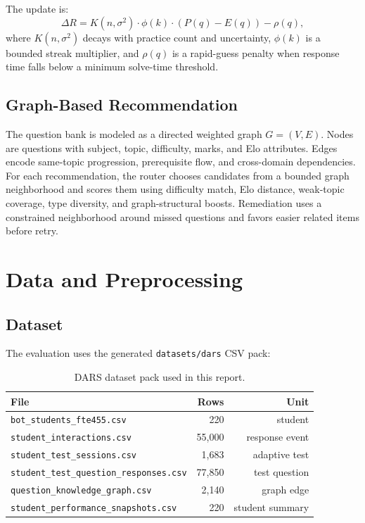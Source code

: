 \documentclass[sigconf,nonacm]{acmart}
\begin{document}
The update is:
\begin{equation}
\Delta R = K(n,\sigma^2)\cdot \phi(k)\cdot(P(q)-E(q)) - \rho(q),
\end{equation}
where $K(n,\sigma^2)$ decays with practice count and uncertainty, $\phi(k)$ is a bounded streak multiplier, and $\rho(q)$ is a rapid-guess penalty when response time falls below a minimum solve-time threshold.

\subsection{Graph-Based Recommendation}
The question bank is modeled as a directed weighted graph $G=(V,E)$. Nodes are questions with subject, topic, difficulty, marks, and Elo attributes. Edges encode same-topic progression, prerequisite flow, and cross-domain dependencies. For each recommendation, the router chooses candidates from a bounded graph neighborhood and scores them using difficulty match, Elo distance, weak-topic coverage, type diversity, and graph-structural boosts. Remediation uses a constrained neighborhood around missed questions and favors easier related items before retry.

\section{Data and Preprocessing}
\subsection{Dataset}
The evaluation uses the generated \texttt{datasets/dars} CSV pack:

\begin{table}[h]
\centering
\caption{DARS dataset pack used in this report.}
\label{tab:dataset}
\begin{tabular}{lrr}
\toprule
File & Rows & Unit \\
\midrule
\texttt{bot\_students\_fte455.csv} & 220 & student \\
\texttt{student\_interactions.csv} & 55,000 & response event \\
\texttt{student\_test\_sessions.csv} & 1,683 & adaptive test \\
\texttt{student\_test\_question\_responses.csv} & 77,850 & test question \\
\texttt{question\_knowledge\_graph.csv} & 2,140 & graph edge \\
\texttt{student\_performance\_snapshots.csv} & 220 & student summary \\
\bottomrule
\end{tabular}
\end{table}
\end{document}
